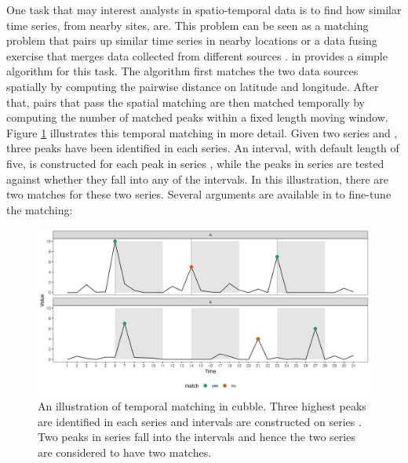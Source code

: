 \documentclass[
]{jss}
\begin{document}
One task that may interest analysts in spatio-temporal data is to find how similar time series, from nearby sites, are. This problem can be seen as a matching problem \citep{stuart2010matching, mcintosh2018using} that pairs up similar time series in nearby locations or a data fusing exercise that merges data collected from different sources \citep{cocchi2019data}.  in  provides a simple algorithm for this task. The algorithm first matches the two data sources spatially by computing the pairwise distance on latitude and longitude. After that, pairs that pass the spatial matching are then matched temporally by computing the number of matched peaks within a fixed length moving window. Figure \ref{fig:illu-matching} illustrates this temporal matching in more detail. Given two series  and , three peaks have been identified in each series. An interval, with default length of five, is constructed for each peak in series , while the peaks in series  are tested against whether they fall into any of the intervals. In this illustration, there are two matches for these two series. Several arguments are available in  to fine-tune the matching:

\begin{CodeChunk}
\begin{figure}

{\centering \includegraphics[width=1\linewidth]{../figures/illu-matching} 

}

\caption{An illustration of temporal matching in cubble. Three highest peaks are identified in each series and intervals are constructed on series . Two peaks in series  fall into the intervals and hence the two series are considered to have two matches.}\label{fig:illu-matching}
\end{figure}
\end{CodeChunk}
\end{document}
